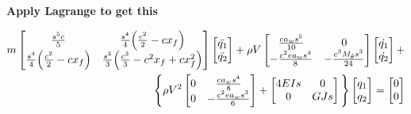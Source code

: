 \documentclass[11pt]{article}
\begin{document}
\textbf{Apply Lagrange to get this}

\begin{gather}
\begin{split}
    m\begin{bmatrix} \frac{s^5c}{5} & \frac{s^4}{4}\Big{(}\frac{c^2}{2}-cx_f\Big{)} \\ \frac{s^4}{4}\Big{(}\frac{c^2}{2}-cx_f\Big{)} & \frac{s^3}{3}\Big{(}\frac{c^3}{3}-c^2x_f+cx_f^2\Big{)} \end{bmatrix} \begin{bmatrix}\ddot{q_1}\\ \ddot{q_2} \end{bmatrix} + \rho V \begin{bmatrix} \frac{ca_w s^5}{10} & 0 \\ -\frac{c^2e a_w s^4}{8} & -\frac{c^3M_{\dot\theta}s^3}{24} \end{bmatrix}\begin{bmatrix}\dot{q_1}\\ \dot{q_2}\end{bmatrix} +\\ \Bigg{\{}\rho V^2  \begin{bmatrix} 0 & \frac{ca_ws^4}{8} \\ 0 & -\frac{c^2ea_ws^3}{6} \end{bmatrix} + \begin{bmatrix} 4EIs & 0 \\ 0 & GJs \end{bmatrix} \Bigg{\}}\begin{bmatrix} q_1 \\ q_2 \end{bmatrix} = \begin{bmatrix} 0 \\ 0 \end{bmatrix}
\end{split}
\end{gather}

\end{document}
